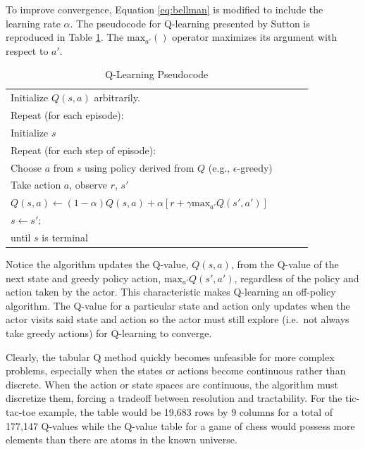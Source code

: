 To improve convergence, Equation \ref{eq:bellman} is modified to include the learning rate $\alpha$. The pseudocode for Q-learning presented by Sutton is reproduced in Table \ref{tab:qlearning_pseudo}. The $\text{max}_{a'}()$ operator maximizes its argument with respect to $a'$.
\begin{table}[h]
	\caption{Q-Learning Pseudocode}  \label{tab:qlearning_pseudo}
	\begin{tabular}{|p{0.9\linewidth}|}\hline %
		Initialize $Q(s,a)$ arbitrarily. \\
		Repeat (for each episode): \\
		\qquad Initialize $s$\\
		\qquad Repeat (for each step of episode):\\
		\qquad \qquad Choose $a$ from $s$ using policy derived from $Q$ (e.g., $\epsilon$-greedy)\\
		\qquad \qquad Take action $a$, observe $r$, $s'$\\
		\qquad \qquad $Q(s,a)\gets (1-\alpha)Q(s,a) + \alpha [r + \gamma \text{max}_{a'}Q(s',a')]$\\
		\qquad \qquad $s \gets s';$\\
		\qquad until $s$ is terminal \\
		\hline
	\end{tabular}
\end{table}

Notice the algorithm updates the Q-value, $Q(s,a)$, from the Q-value of the next state and greedy policy action, $\text{max}_{a'}Q(s',a')$, regardless of the policy and action taken by the actor. This characteristic makes Q-learning an off-policy algorithm. The Q-value for a particular state and action only updates when the actor visits said state and action so the actor must still explore (i.e.\ not always take greedy actions) for Q-learning to converge.

Clearly, the tabular Q method quickly becomes unfeasible for more complex problems, especially when the states or actions become continuous rather than discrete. When the action or state spaces are continuous, the algorithm must discretize them, forcing a tradeoff between resolution and tractability. For the tic-tac-toe example, the table would be 19,683 rows by 9 columns for a total of 177,147 Q-values while the Q-value table for a game of chess would possess more elements than there are atoms in the known universe.

